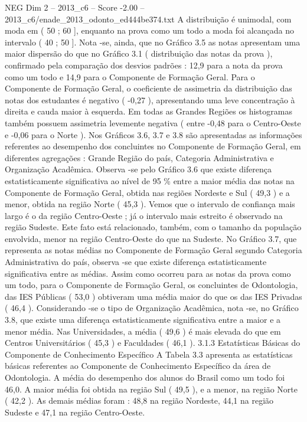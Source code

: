 \begin{textsample}{NEG Dim 2 – 2013\_c6 – Score -2.00 – 2013\_c6/enade\_2013\_odonto\_ed444be374.txt}
A distribuição é unimodal, com moda em ( 50 ; 60 ], enquanto na prova como um todo a moda foi alcançada no intervalo ( 40 ; 50 ].
Nota -se, ainda, que no Gráfico 3.5 as notas apresentam uma maior dispersão do que no Gráfico 3.1 ( distribuição das notas da prova ), confirmado pela comparação dos desvios padrões : 12,9 para a nota da prova como um todo e 14,9 para o Componente de Formação Geral.
Para o Componente de Formação Geral, o coeficiente de assimetria da distribuição das notas dos estudantes é negativo ( -0,27 ), apresentando uma leve concentração à direita e cauda maior à esquerda.
Em todas as Grandes Regiões os histogramas também possuem assimetria levemente negativa ( entre -0,48 para o Centro-Oeste e -0,06 para o Norte ).
Nos Gráficos 3.6, 3.7 e 3.8 são apresentadas as informações referentes ao desempenho dos concluintes no Componente de Formação Geral, em diferentes agregações : Grande Região do país, Categoria Administrativa e Organização Acadêmica.
Observa -se pelo Gráfico 3.6 que existe diferença estatisticamente significativa ao nível de 95 \% entre a maior média das notas na Componente de Formação Geral, obtida nas regiões Nordeste e Sul ( 49,3 ) e a menor, obtida na região Norte ( 45,3 ).
Vemos que o intervalo de confiança mais largo é o da região Centro-Oeste ; já o intervalo mais estreito é observado na região Sudeste.
Este fato está relacionado, também, com o tamanho da população envolvida, menor na região Centro-Oeste do que na Sudeste.
No Gráfico 3.7, que representa as notas médias no Componente de Formação Geral segundo Categoria Administrativa do país, observa -se que existe diferença estatisticamente significativa entre as médias.
Assim como ocorreu para as notas da prova como um todo, para o Componente de Formação Geral, os concluintes de Odontologia, das IES Públicas ( 53,0 ) obtiveram uma média maior do que os das IES Privadas ( 46,4 ).
Considerando -se o tipo de Organização Acadêmica, nota -se, no Gráfico 3.8, que existe uma diferença estatisticamente significativa entre a maior e a menor média.
Nas Universidades, a média ( 49,6 ) é mais elevada do que em Centros Universitários ( 45,3 ) e Faculdades ( 46,1 ). 3.1.3 Estatísticas Básicas do Componente de Conhecimento Específico A Tabela 3.3 apresenta as estatísticas básicas referentes ao Componente de Conhecimento Específico da área de Odontologia.
A média do desempenho dos alunos do Brasil como um todo foi 46,0.
A maior média foi obtida na região Sul ( 49,5 ), e a menor, na região Norte ( 42,2 ).
As demais médias foram : 48,8 na região Nordeste, 44,1 na região Sudeste e 47,1 na região Centro-Oeste.

\end{textsample}
